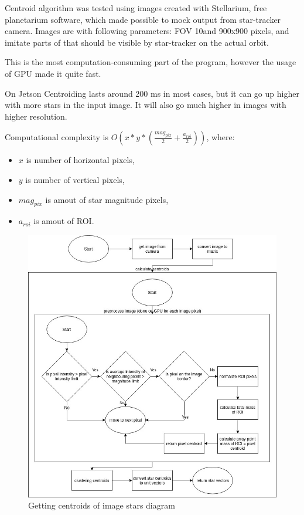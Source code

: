 \documentclass[12pt,a4paper,twoside]{article}
\begin{document}
Centroid algorithm was tested using images created with Stellarium, free planetarium software, which made possible to mock output from star-tracker camera. Images are with following parameters: FOV 10\degree and 900x900 pixels, and imitate parts of that should be visible by star-tracker on the actual orbit.

This is the most computation-consuming part of the program, however the usage of GPU made it quite fast.

On Jetson Centroiding lasts around 200 ms in most cases, but it can go up higher with more stars in the input image. It will also go much higher in images with higher resolution.

Computational complexity is $O(x*y*(\frac{mag_{pix}}{2}+\frac{a_{roi}}{2}))$, where:
\begin{itemize}[noitemsep]
\item $x$ is number of horizontal pixels,
\item $y$ is number of vertical pixels,
\item $mag_{pix}$ is amout of star magnitude pixels,
\item $a_{roi}$ is amout of ROI.
\end{itemize}

\begin{figure}[!htbp]
\includegraphics[scale=0.51]{get_image_stars_diagram.jpg}
\centering
\caption{Getting centroids of image stars diagram}
\label{fig:get_image_stars_diagram}
\end{figure}
\end{document}
